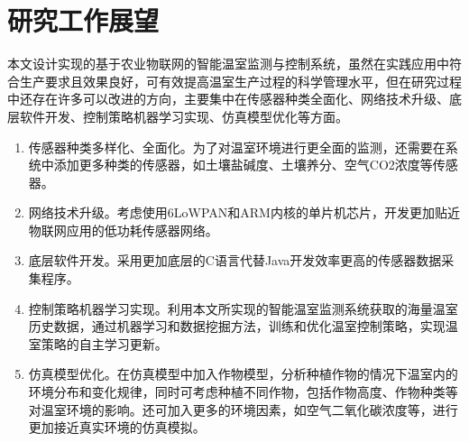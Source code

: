 \section{研究工作展望}
本文设计实现的基于农业物联网的智能温室监测与控制系统，虽然在实践应用中符合生产要求且效果良好，可有效提高温室生产过程的科学管理水平，但在研究过程中还存在许多可以改进的方向，主要集中在传感器种类全面化、网络技术升级、底层软件开发、控制策略机器学习实现、仿真模型优化等方面。
	\begin{enumerate}
		\item 传感器种类多样化、全面化。为了对温室环境进行更全面的监测，还需要在系统中添加更多种类的传感器，如土壤盐碱度、土壤养分、空气CO2浓度等传感器。
		\item 网络技术升级。考虑使用6LoWPAN和ARM内核的单片机芯片，开发更加贴近物联网应用的低功耗传感器网络。
		\item 底层软件开发。采用更加底层的C语言代替Java开发效率更高的传感器数据采集程序。
		\item 控制策略机器学习实现。利用本文所实现的智能温室监测系统获取的海量温室历史数据，通过机器学习和数据挖掘方法，训练和优化温室控制策略，实现温室策略的自主学习更新。
		\item 仿真模型优化。在仿真模型中加入作物模型，分析种植作物的情况下温室内的环境分布和变化规律，同时可考虑种植不同作物，包括作物高度、作物种类等对温室环境的影响。还可加入更多的环境因素，如空气二氧化碳浓度等，进行更加接近真实环境的仿真模拟。
 	\end{enumerate}
